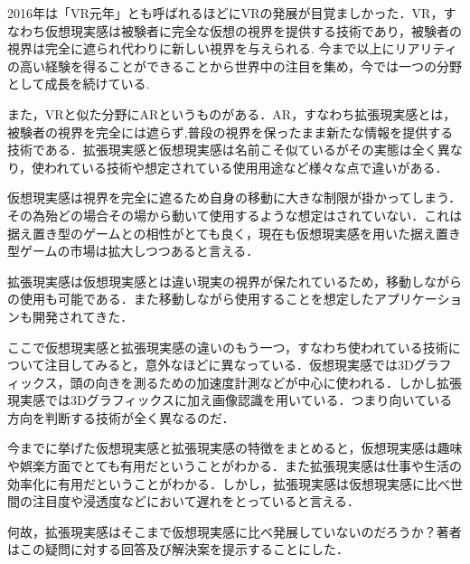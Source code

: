 2016年は「VR元年」とも呼ばれるほどにVRの発展が目覚ましかった．VR，すなわち仮想現実感は被験者に完全な仮想の視界を提供する技術であり，被験者の視界は完全に遮られ代わりに新しい視界を与えられる\cite{VR}.
今まで以上にリアリティの高い経験を得ることができることから世界中の注目を集め，今では一つの分野として成長を続けている.

また，VRと似た分野にARというものがある．AR，すなわち拡張現実感とは，被験者の視界を完全には遮らず,普段の視界を保ったまま新たな情報を提供する技術である．拡張現実感と仮想現実感は名前こそ似ているがその実態は全く異なり，使われている技術や想定されている使用用途など様々な点で違いがある．

仮想現実感は視界を完全に遮るため自身の移動に大きな制限が掛かってしまう．その為殆どの場合その場から動いて使用するような想定はされていない．これは据え置き型のゲームとの相性がとても良く，現在も仮想現実感を用いた据え置き型ゲームの市場は拡大しつつあると言える\cite{VRnews}．

拡張現実感は仮想現実感とは違い現実の視界が保たれているため，移動しながらの使用も可能である．また移動しながら使用することを想定したアプリケーションも開発されてきた\cite{ARapp}．

ここで仮想現実感と拡張現実感の違いのもう一つ，すなわち使われている技術について注目してみると，意外なほどに異なっている．仮想現実感では3Dグラフィックス，頭の向きを測るための加速度計測などが中心に使われる．しかし拡張現実感では3Dグラフィックスに加え画像認識を用いている．つまり向いている方向を判断する技術が全く異なるのだ．

今までに挙げた仮想現実感と拡張現実感の特徴をまとめると，仮想現実感は趣味や娯楽方面でとても有用だということがわかる．また拡張現実感は仕事や生活の効率化に有用だということがわかる．しかし，拡張現実感は仮想現実感に比べ世間の注目度や浸透度などにおいて遅れをとっていると言える．

何故，拡張現実感はそこまで仮想現実感に比べ発展していないのだろうか？著者はこの疑問に対する回答及び解決案を提示することにした．